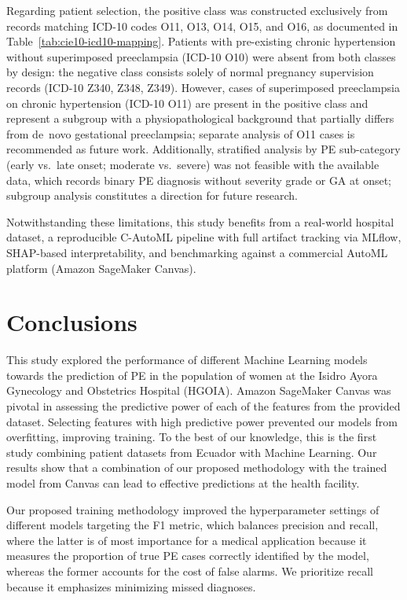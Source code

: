 \documentclass[diagnostics,article,accept,pdftex,moreauthors]{Definitions/mdpi}
\begin{document}
Regarding patient selection, the positive class was constructed
exclusively from records matching ICD-10 codes O11, O13, O14, O15, and O16,
as documented in Table~\ref{tab:cie10-icd10-mapping}. Patients with pre-existing
chronic hypertension without superimposed preeclampsia (ICD-10 O10) were absent
from both classes by design: the negative class consists solely of normal
pregnancy supervision records (ICD-10 Z340, Z348, Z349). However, cases of
superimposed preeclampsia on chronic hypertension (ICD-10 O11) are present in
the positive class and represent a subgroup with a physiopathological background
that partially differs from de~novo gestational preeclampsia; separate analysis
of O11 cases is recommended as future work. Additionally, stratified analysis by
\ac{PE} sub-category (early vs.\ late onset; moderate vs.\ severe) was not
feasible with the available data, which records binary \ac{PE} diagnosis without
severity grade or \ac{GA} {at} %
onset; subgroup analysis constitutes a direction for future research.

Notwithstanding these limitations, this study benefits from
a real-world hospital dataset, a reproducible C-AutoML pipeline with full
artifact tracking via MLflow, SHAP-based interpretability, and benchmarking
against a commercial AutoML platform (Amazon SageMaker Canvas).

\section{Conclusions}
\label{sec:conclusion}
This study explored the performance of different Machine Learning
models towards the prediction of \ac{PE} in the population of
women at the Isidro Ayora Gynecology and Obstetrics {Hospital}
(\ac{HGOIA}). %
Amazon SageMaker Canvas was pivotal in
assessing the predictive power of each of the features from the
provided dataset. Selecting features with high predictive power
prevented our models from overfitting, improving training. To the best of our
knowledge, this is the first study combining patient datasets from
Ecuador with Machine Learning. Our results show that a combination of
our proposed methodology with the trained model from Canvas can lead
to effective predictions at the health facility.

Our proposed training methodology improved the hyperparameter settings
of different models targeting the \ac{F1} metric, which balances
precision and recall, where the latter is of most importance for a
medical application because it measures the proportion of true
\ac{PE} cases correctly identified by the model, whereas the
former accounts for the cost of false alarms. We prioritize recall
because it emphasizes minimizing missed diagnoses.
\end{document}
